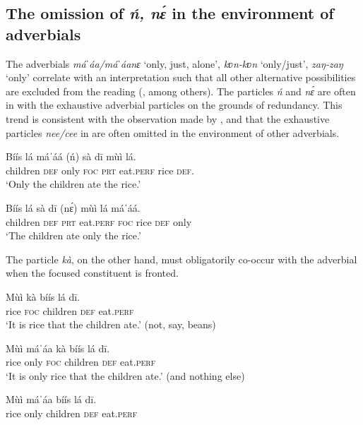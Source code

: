 \documentclass[output=paper,modfonts,nonflat,
\ChapterDOI{10.5281/zenodo.3367154}
 hidelinks
]{langsci/langscibook}
\begin{document}
 
\subsection{The omission of \textit{ń, nɛ́} in the environment of adverbials}\label{sec:abubakari:4.1}
 

The adverbials \textit{máˈáa/máˈáanɛ} `only, just, alone', \textit{kʋn-kʋn} ‘only/just’, \textit{zaŋ-zaŋ} ‘only’ correlate with an  interpretation such that all other alternative possibilities are excluded from the reading (\citealt[see][]{rooth1985,Rooth1992,krifka2006,vanderWal2013}, among others). The particles \textit{ń} and \textit{nɛ́} are often in  with the exhaustive adverbial particles on the grounds of redundancy. This trend is consistent with the observation made by \citet[256]{hartmann2007}, \citet[511]{jaggar2001} and \citet[190]{newman2000hausa} that the exhaustive particles \textit{nee/cee} in  are often omitted in the environment of other adverbials. 

 
\ea\label{ex:abubakari:27}
\gll Bíís    lá  máˈáá    (ń)  sà  dī mùì  lá.\\
children  \textsc{def}  only    \textsc{foc}  \textsc{prt}  eat.\textsc{perf}  rice  \textsc{def}.\\
\glt ‘Only the children ate the rice.’ 
\z 

 
\ea\label{ex:abubakari:28} 
\gll Bíís    lá  sà  dī    (nɛ́)  mùì  lá máˈáá.\\
children  \textsc{def}  \textsc{prt}  eat.\textsc{perf}  \textsc{foc}  rice   \textsc{def} only\\
\glt ‘The children ate only the rice.’ 
\z 

The particle \textit{kà}, on the other hand, must obligatorily co-occur with the adverbial when the focused constituent is fronted.

 
\ea\label{ex:abubakari:29} 
\gll Mùì  kà  bíís    lá  dī.\\
rice  \textsc{foc}  children  \textsc{def}  eat.\textsc{perf}\\
\glt ‘It is rice that the children ate.’ (not, say, beans)
\z
 
\ea\label{ex:abubakari:30} 
\gll Mùì  máˈáa    kà  bíís    lá  dī.\\
rice  only    \textsc{foc}  children  \textsc{def}  eat.\textsc{perf}\\
\glt ‘It is only rice that the children ate.’ (and nothing else)

\gll     *Mùì    máˈáa    bíís    lá  dī.\\
rice    only    children  \textsc{def}  eat.\textsc{perf}\\
\glt
\z
\end{document}
